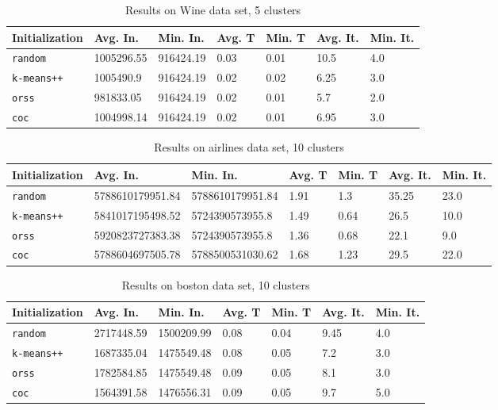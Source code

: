 \documentclass[12pt]{article}
\begin{document}
		\begin{table}[p]
			\begin{center}
				\begin{tabular}{|l|l|l|l|l|l|l|}
					\hline
					Initialization & Avg. In. & Min. In. & Avg. T & Min. T & Avg. It. & Min. It.\\\hline
					\texttt{random} & 1005296.55 & 916424.19 & 0.03 & 0.01 & 10.5 & 4.0\\\hline
					\texttt{k-means++} & 1005490.9 & 916424.19 & 0.02 & 0.02 & 6.25 & 3.0\\\hline
					\texttt{orss} & 981833.05 & 916424.19 & 0.02 & 0.01 & 5.7 & 2.0\\\hline
					\texttt{coc} & 1004998.14 & 916424.19 & 0.02 & 0.01 & 6.95 & 3.0\\\hline
				\end{tabular}
				\caption{Results on Wine data set, 5 clusters}
				\label{tbl:Wine5}
			\end{center}
		\end{table}

		\begin{table}[p]
			\begin{center}
				\begin{tabular}{|l|l|l|l|l|l|l|}
					\hline
					Initialization & Avg. In. & Min. In. & Avg. T & Min. T & Avg. It. & Min. It.\\\hline
					\texttt{random} & 5788610179951.84 & 5788610179951.84 & 1.91 & 1.3 & 35.25 & 23.0\\\hline
					\texttt{k-means++} & 5841017195498.52 & 5724390573955.8 & 1.49 & 0.64 & 26.5 & 10.0\\\hline
					\texttt{orss} & 5920823727383.38 & 5724390573955.8 & 1.36 & 0.68 & 22.1 & 9.0\\\hline
					\texttt{coc} & 5788604697505.78 & 5788500531030.62 & 1.68 & 1.23 & 29.5 & 22.0\\\hline
				\end{tabular}
				\caption{Results on airlines data set, 10 clusters}
				\label{tbl:airlines10}
			\end{center}
		\end{table}

		\begin{table}[p]
			\begin{center}
				\begin{tabular}{|l|l|l|l|l|l|l|}
					\hline
					Initialization & Avg. In. & Min. In. & Avg. T & Min. T & Avg. It. & Min. It.\\\hline
					\texttt{random} & 2717448.59 & 1500209.99 & 0.08 & 0.04 & 9.45 & 4.0\\\hline
					\texttt{k-means++} & 1687335.04 & 1475549.48 & 0.08 & 0.05 & 7.2 & 3.0\\\hline
					\texttt{orss} & 1782584.85 & 1475549.48 & 0.09 & 0.05 & 8.1 & 3.0\\\hline
					\texttt{coc} & 1564391.58 & 1476556.31 & 0.09 & 0.05 & 9.7 & 5.0\\\hline
				\end{tabular}
				\caption{Results on boston data set, 10 clusters}
				\label{tbl:boston10}
			\end{center}
		\end{table}
\end{document}
